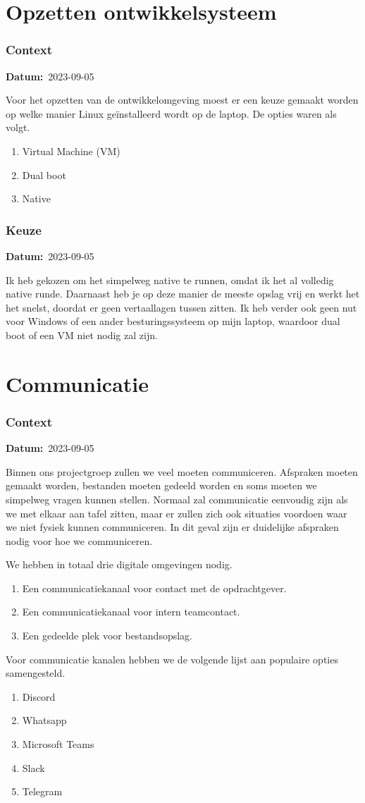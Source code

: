 \documentclass[a4paper]{report}
\newcommand{\teambox}{
  \begin{tcolorbox}[hbox, colback=blue!5!white,colframe=blue!75!black,
    left=.1mm, right=.1mm, top=.1mm, bottom=.1mm, fontupper=\scriptsize\sffamily]
    Team Keuze
  \end{tcolorbox}
}
\newcommand{\personalbox}{
  \begin{tcolorbox}[hbox, colback=green!5!white,colframe=green!75!black,
    left=.1mm, right=.1mm, top=.1mm, bottom=.1mm, fontupper=\scriptsize\sffamily]
    Persoonlijke Keuze
  \end{tcolorbox}
}
\newcommand{\teamchoice}[1]{
  \section[ #1 ]{#1~\mbox{\raisebox{-2.5pt}{\teambox}}}
}
\newcommand{\personalchoice}[1]{
  \section[ #1 ]{#1~\mbox{\raisebox{-2.5pt}{\personalbox}}}
}
\newcommand{\timestamp}[1]{
  \mbox{\scriptsize \textbf{Datum:} #1} \smallbreak
}
\begin{document}
\personalchoice{Opzetten ontwikkelsysteem}
\subsubsection{Context}
\timestamp{2023-09-05}
Voor het opzetten van de ontwikkelomgeving moest er een keuze gemaakt worden op welke manier Linux geïnstalleerd wordt op de laptop. 
De opties waren als volgt.
\begin{enumerate}
  \item Virtual Machine (VM)
  \item Dual boot
  \item Native
\end{enumerate}

\subsubsection{Keuze}
\timestamp{2023-09-05}
Ik heb gekozen om het simpelweg native te runnen, omdat ik het al volledig native runde. 
 Daarnaast heb je op deze manier de meeste opslag vrij en werkt het het snelst, doordat er geen vertaallagen tussen zitten.
Ik heb verder ook geen nut voor Windows of een ander besturingssysteem op mijn laptop, waardoor dual boot of een VM niet nodig zal zijn.

\teamchoice{Communicatie}
\subsubsection{Context}
\timestamp{2023-09-05}
Binnen ons projectgroep zullen we veel moeten communiceren. Afspraken moeten gemaakt worden, bestanden moeten gedeeld worden en soms moeten we simpelweg vragen kunnen stellen.
Normaal zal communicatie eenvoudig zijn als we met elkaar aan tafel zitten, maar er zullen zich ook situaties voordoen waar we niet fysiek kunnen communiceren.
In dit geval zijn er duidelijke afspraken nodig voor hoe we communiceren.
\par \smallskip 
We hebben in totaal drie digitale omgevingen nodig.
\begin{enumerate}
  \item Een communicatiekanaal voor contact met de opdrachtgever.
  \item Een communicatiekanaal voor intern teamcontact.
  \item Een gedeelde plek voor bestandsopslag.
\end{enumerate}

Voor communicatie kanalen hebben we de volgende lijst aan populaire opties samengesteld.
\begin{enumerate}
  \item Discord 
  \item Whatsapp 
  \item Microsoft Teams 
  \item Slack 
  \item Telegram 
\end{enumerate}
\end{document}
